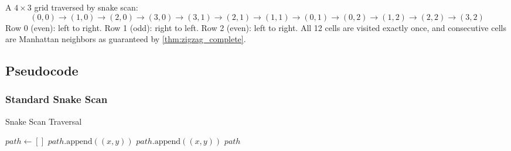 \begin{example}\label{ex:snake_scan}
A $4 \times 3$ grid traversed by snake scan:
\[
(0,0) \to (1,0) \to (2,0) \to (3,0) \to
(3,1) \to (2,1) \to (1,1) \to (0,1) \to
(0,2) \to (1,2) \to (2,2) \to (3,2)
\]
Row 0 (even): left to right. Row 1 (odd): right to left. Row 2 (even): left to right. All 12 cells are visited exactly once, and consecutive cells are Manhattan neighbors as guaranteed by \cref{thm:zigzag_complete}.
\end{example}

\subsection{Pseudocode}

\subsubsection{Standard Snake Scan}
\begin{algorithm}
\caption{Snake Scan Traversal}\label{alg:snake_scan}
\begin{algorithmic}
    \State $path \gets []$
                \State $path.\text{append}((x, y))$
            \EndFor
        \Else
                \State $path.\text{append}((x, y))$
            \EndFor
        \EndIf
    \EndFor
    \Return $path$
\EndFunction
\end{algorithmic}
\end{algorithm}

